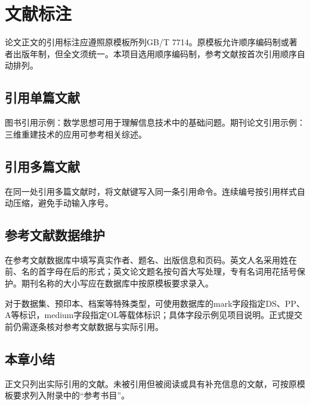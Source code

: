 \chapter{文献标注}
论文正文的引用标注应遵照原模板所列GB/T 7714。原模板允许顺序编码制或著者出版年制，但全文须统一。本项目选用顺序编码制，参考文献按首次引用顺序自动排列。
\section{引用单篇文献}
图书引用示例：数学思想可用于理解信息技术中的基础问题\cite{wu2012}。期刊论文引用示例：三维重建技术的应用可参考相关综述\cite{ma2018}。
\section{引用多篇文献}
在同一处引用多篇文献时，将文献键写入同一条引用命令\cite{wu2012,ma2018,chen2022}。连续编号按引用样式自动压缩，避免手动输入序号。
\section{参考文献数据维护}
在参考文献数据库中填写真实作者、题名、出版信息和页码。英文人名采用姓在前、名的首字母在后的形式；英文论文题名按句首大写处理，专有名词用花括号保护。期刊名称的大小写应在数据库中按原模板要求录入。

对于数据集、预印本、档案等特殊类型，可使用数据库的mark字段指定DS、PP、A等标识，medium字段指定OL等载体标识；具体字段示例见项目说明。正式提交前仍需逐条核对参考文献数据与实际引用。
\section{本章小结}
正文只列出实际引用的文献。未被引用但被阅读或具有补充信息的文献，可按原模板要求列入附录中的“参考书目”。

